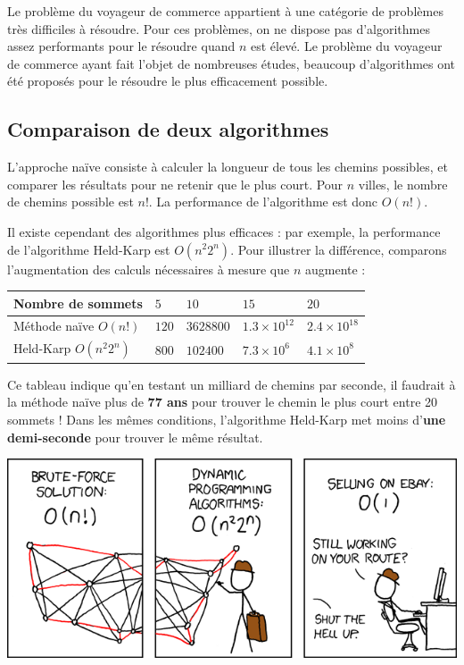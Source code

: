 Le problème du voyageur de commerce appartient à une catégorie de problèmes très
difficiles à résoudre. Pour ces problèmes, on ne dispose pas d'algorithmes assez
performants pour le résoudre quand $n$ est élevé. Le problème du voyageur de
commerce ayant fait l'objet de nombreuses études, beaucoup d'algorithmes ont été
proposés pour le résoudre le plus efficacement possible.

\subsection*{Comparaison de deux algorithmes}

L'approche naïve consiste à calculer la longueur de tous les chemins possibles,
et comparer les résultats pour ne retenir que le plus court. Pour $n$ villes, le
nombre de chemins possible est $n!$. La performance de l'algorithme est donc
$O(n!)$.

Il existe cependant des algorithmes plus efficaces : par exemple, la performance
de l'algorithme Held-Karp est $O(n^{2}2^n)$. Pour illustrer la différence,
comparons l'augmentation des calculs nécessaires à mesure que $n$ augmente :

\begin{center}
  \begin{tabular}{|l|llll|}
    \hline
    Nombre de sommets       & $5$   & $10$      & $15$            & $20$ \\
    \hline
    Méthode naïve $O(n!)$   & $120$ & $3628800$ & $1.3 \times 10^{12}$ & $2.4 \times 10^{18}$ \\
    Held-Karp $O(n^{2}2^n)$ & $800$ & $102400$  & $7.3 \times 10^6$       & $4.1 \times 10^8$ \\
    \hline
  \end{tabular} 
\end{center}

Ce tableau indique qu'en testant un milliard de chemins par seconde, il faudrait
à la méthode naïve plus de \textbf{77 ans} pour trouver le chemin le plus court
entre 20 sommets ! Dans les mêmes conditions, l'algorithme Held-Karp met moins
d'\textbf{une demi-seconde} pour trouver le même résultat.

\begin{center}
  \includegraphics[width=\linewidth]{img/tsp_xkcd.png}
  \label{img:tsp_xkcd}
\end{center}


